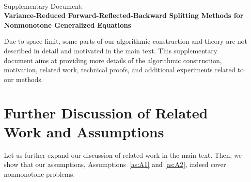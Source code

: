 \documentclass{article}
\newcommand{\beforesec}{\vspace{-1.5ex}}
\newcommand{\aftersec}{\vspace{-1.25ex}}
\theoremstyle{plain}
\theoremstyle{definition}
\theoremstyle{remark}
\begin{document}
%

\newpage
\appendix
\onecolumn

\vspace{-3ex}
\begin{center}
\hrulefill\vspace{1ex}\\
{\Large Supplementary Document:} \vspace{0.5ex}\\
\textbf{\Large
Variance-Reduced Forward-Reflected-Backward Splitting Methods for \vspace{0.75ex}\\ Nonmonotone Generalized Equations
}\\
\hrulefill
\end{center}
\vspace{2ex}

Due to space limit, some parts of our algorithmic construction and theory are not described in detail and motivated in the main text.
This supplementary document aims at providing more details of the algorithmic construction, motivation, related work, technical proofs, and additional experiments related to our methods.

\beforesec
\section{Further Discussion of Related Work and Assumptions}\label{apdix:sec:further_related_work}
\aftersec
Let us further expand our discussion of related work in the main text.
Then, we show that our assumptions, Assumptions~\ref{as:A1} and \ref{as:A2}, indeed cover nonmonotone problems.
\end{document}

